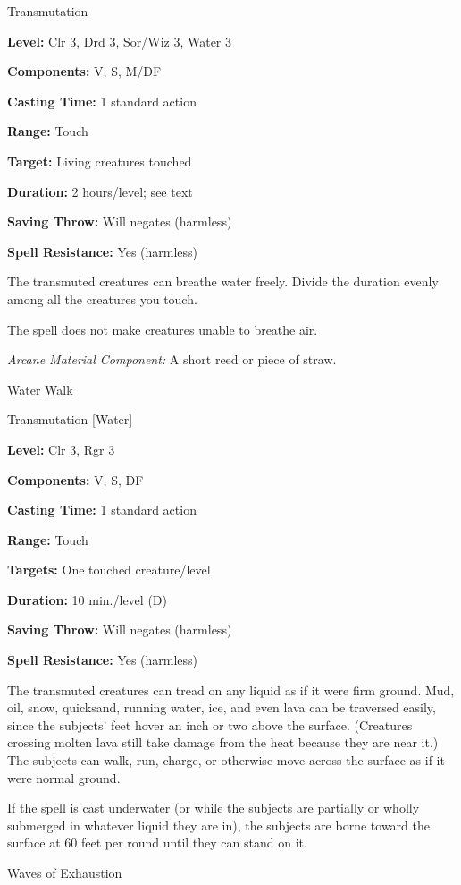 \documentclass{article}
\begin{document}
Transmutation

\textbf{Level:} Clr 3, Drd 3, Sor/Wiz 3, Water 3

\textbf{Components:} V, S, M/DF

\textbf{Casting Time:} 1 standard action

\textbf{Range:} Touch

\textbf{Target:} Living creatures touched

\textbf{Duration:} 2 hours/level; see text

\textbf{Saving Throw: }Will negates (harmless)

\textbf{Spell Resistance:} Yes (harmless)

The transmuted creatures can breathe water freely. Divide the duration evenly among 
all the creatures you touch.

The spell does not make creatures unable to breathe air.

\textit{Arcane Material Component: }A short reed or piece of straw.

\vspace{12pt}
Water Walk

Transmutation [Water]

\textbf{Level:} Clr 3, Rgr 3

\textbf{Components:} V, S, DF

\textbf{Casting Time:} 1 standard action

\textbf{Range:} Touch

\textbf{Targets:} One touched creature/level

\textbf{Duration:} 10 min./level (D)

\textbf{Saving Throw: }Will negates (harmless)

\textbf{Spell Resistance:} Yes (harmless)

The transmuted creatures can tread on any liquid as if it were firm ground. Mud, 
oil, snow, quicksand, running water, ice, and even lava can be traversed easily, 
since the subjects' feet hover an inch or two above the surface. (Creatures crossing 
molten lava still take damage from the heat because they are near it.) The subjects 
can walk, run, charge, or otherwise move across the surface as if it were normal 
ground.

If the spell is cast underwater (or while the subjects are partially or wholly 
submerged in whatever liquid they are in), the subjects are borne toward the surface 
at 60 feet per round until they can stand on it.

\vspace{12pt}
Waves of Exhaustion
\end{document}
